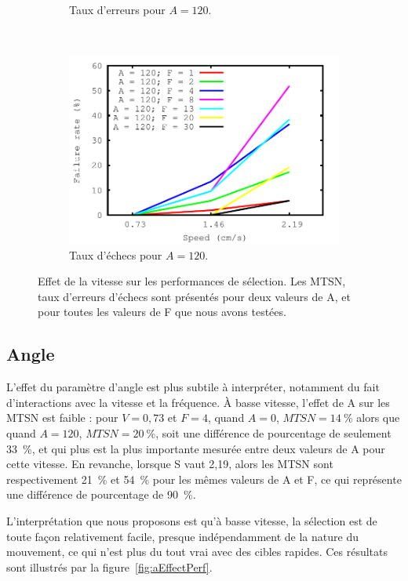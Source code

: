 \begin{figure}[!htb]
\begin{subfigure}[t]{\subImgWlineplot}
			\caption{Taux d'erreurs pour $A = 120$.}
			\label{fig:spEffect_e_120}
		\end{subfigure}
		~
		\begin{subfigure}[t]{\subImgWlineplot}
			\centering
			\includegraphics[width=\textwidth]{figures/ch4/speed_angle_120_failures}
			\caption{Taux d'échecs pour $A = 120$.}
			\label{fig:spEffect_f_120}
		\end{subfigure}
		\caption[Effet de la vitesse sur les performances de sélection]{Effet de la vitesse sur les performances de sélection. Les MTSN, taux d'erreurs d'échecs sont présentés pour deux valeurs de A, et pour toutes les valeurs de F que nous avons testées.}
		\label{fig:spEffectPerf}
	\end{figure}


	\subsection{Angle}
	L'effet du paramètre d'angle est plus subtile à interpréter, notamment du fait d'interactions avec la vitesse et la fréquence. À basse vitesse, l'effet de A sur les MTSN est faible : pour $V = 0,73$ et $F = 4$, quand $A= 0$, $MTSN = 14~\%{}$ alors que quand $A = 120$, $MTSN = 20~\%{}$, soit une différence de pourcentage de seulement 33~\%{}, et qui plus est la plus importante mesurée entre deux valeurs de A pour cette vitesse. En revanche, lorsque S vaut 2,19, alors les MTSN sont respectivement 21~\%{} et 54~\%{} pour les mêmes valeurs de A et F, ce qui représente une différence de pourcentage de 90~\%{}.
	
	L'interprétation que nous proposons est qu'à basse vitesse, la sélection est de toute façon relativement facile, presque indépendamment de la nature du mouvement, ce qui n'est plus du tout vrai avec des cibles rapides. Ces résultats sont illustrés par la figure~\ref{fig:aEffectPerf}.

